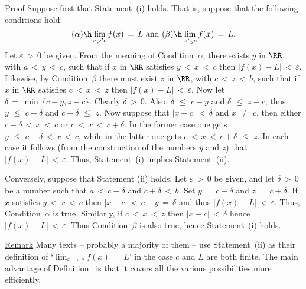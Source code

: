 {\V


        \underline{Proof} Suppose first that Statement~(i) holds. That is, suppose that the following conditions hold:
        \begin{displaymath}
        ({\alpha}) \h \lim_{x{\nearrow}c} f(x) \,=\, L
    \mbox{ and }
        ({\beta})  \h \lim_{x{\searrow}c} f(x) \,=\, L.
        \end{displaymath}
    Let ${\varepsilon}\,>\,0$ be given. From the meaning of Condition~${\alpha}$, there exists $y$ in ${\RR}$, with $a\,<\,y\,<\,c$, such that if $x$ in ${\RR}$ satisfies $y\,<\,x\,<\,c$ then $|f(x)-L|\,<\,{\varepsilon}$.
    Likewise, by Condition~${\beta}$ there must exist $z$ in ${\RR}$, with $c\,<\,z\,<\,b$, such that if $x$ in ${\RR}$ satisfies $c\,<\,x\,<\,z$ then $|f(x)-L|\,<\,{\varepsilon}$.
    Now let ${\delta} \,=\, {\min\,}\{c-y,z-c\}$.
    Clearly ${\delta}\,>\,0$. Also, ${\delta}\,\,{\leq}\,\,c-y$ and ${\delta}\,\,{\leq}\,\,z-c$; thus $y\,\,{\leq}\,\,c-{\delta}$ and $c+{\delta}\,\,{\leq}\,\,z$.
    Now suppose that $|x-c|\,<\,{\delta}$ and $x \,\,{\neq}\,\, c$.
    then either $c-{\delta}\,<\,x\,<\,c$ or $c\,<\,x\,<\,c+{\delta}$.
    In the former case one gets $y\,\,{\leq}\,\,c-{\delta}\,<\,x\,<\,c$, while in the latter one gets $c\,<\,x\,<\,c+{\delta}\,\,{\leq}\,\,z$.
    In each case it follows (from the construction of the numbers $y$ and $z$) that $|f(x)-L|\,<\,{\varepsilon}$.
    Thus, Statement~(i) implies Statement~(ii).

        Conversely, suppose that Statement (ii) holds. Let ${\varepsilon}\,>\,0$ be given, and let ${\delta}\,>\,0$ be a number such that $a\,<\,c-{\delta}$ and $c+{\delta}\,<\,b$.
    Set $y \,=\, c-{\delta}$ and $z \,=\, c+{\delta}$.
    If $x$ satisfies $y\,<\,x\,<\,c$ then $|x-c|\,<\,c-y \,=\,{\delta}$ and thus $|f(x)-L|\,<\,{\varepsilon}$.
    Thus, Condition~${\alpha}$ is true.
    Similarly, if $c\,<\,x\,<\,z$ then $|x-c|\,<\,{\delta}$ hence $|f(x)-L|\,<\,{\varepsilon}$.
    Thus Condition~${\beta}$ is also true, hence Statement~(i) holds.

\V

        \underline{Remark} Many texts -- probably a majority of them -- use Statement~(ii) as their definition of `${\displaystyle \lim_{x \,{\rightarrow}\, c} f(x) \,=\, L}$' in the case $c$ and $L$ are both finite.
    The main advantage of Definition~ is that it covers all the various possibilities more efficiently.

\V




}
